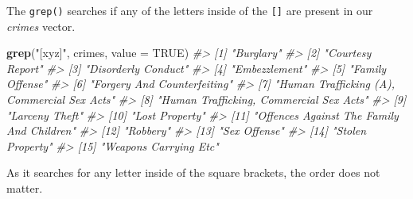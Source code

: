 \documentclass[
  12pt,
]{book}
\newenvironment{Shaded}{\begin{snugshade}}{\end{snugshade}}
\newcommand{\CommentTok}[1]{\textcolor[rgb]{0.37,0.37,0.37}{\textit{#1}}}
\newcommand{\DataTypeTok}[1]{\textcolor[rgb]{0.27,0.27,0.27}{#1}}
\newcommand{\KeywordTok}[1]{\textcolor[rgb]{0.27,0.27,0.27}{\textbf{#1}}}
\newcommand{\NormalTok}[1]{#1}
\newcommand{\OtherTok}[1]{\textcolor[rgb]{0.37,0.37,0.37}{#1}}
\newcommand{\StringTok}[1]{\textcolor[rgb]{0.5,0.5,0.5}{#1}}
\begin{document}
The \texttt{grep()} searches if any of the letters inside of the \texttt{{[}{]}} are present in our \emph{crimes} vector.

\begin{Shaded}
\begin{Highlighting}[]
\KeywordTok{grep}\NormalTok{(}\StringTok{"[xyz]"}\NormalTok{, crimes, }\DataTypeTok{value =} \OtherTok{TRUE}\NormalTok{)}
\CommentTok{\#\textgreater{}  [1] "Burglary"                                  }
\CommentTok{\#\textgreater{}  [2] "Courtesy Report"                           }
\CommentTok{\#\textgreater{}  [3] "Disorderly Conduct"                        }
\CommentTok{\#\textgreater{}  [4] "Embezzlement"                              }
\CommentTok{\#\textgreater{}  [5] "Family Offense"                            }
\CommentTok{\#\textgreater{}  [6] "Forgery And Counterfeiting"                }
\CommentTok{\#\textgreater{}  [7] "Human Trafficking (A), Commercial Sex Acts"}
\CommentTok{\#\textgreater{}  [8] "Human Trafficking, Commercial Sex Acts"    }
\CommentTok{\#\textgreater{}  [9] "Larceny Theft"                             }
\CommentTok{\#\textgreater{} [10] "Lost Property"                             }
\CommentTok{\#\textgreater{} [11] "Offences Against The Family And Children"  }
\CommentTok{\#\textgreater{} [12] "Robbery"                                   }
\CommentTok{\#\textgreater{} [13] "Sex Offense"                               }
\CommentTok{\#\textgreater{} [14] "Stolen Property"                           }
\CommentTok{\#\textgreater{} [15] "Weapons Carrying Etc"}
\end{Highlighting}
\end{Shaded}

As it searches for any letter inside of the square brackets, the order does not matter.
\end{document}
